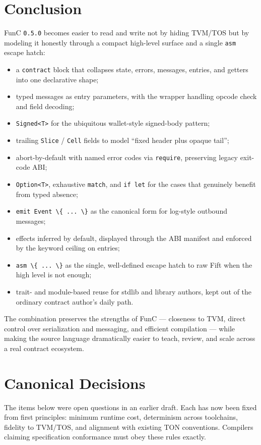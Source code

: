 \documentclass[12pt,oneside]{article}
\begin{document}
\section{Conclusion}
FunC \verb|0.5.0| becomes easier to read and write not by hiding
TVM/TOS but by modeling it honestly through a compact high-level
surface and a single \verb|asm| escape hatch:

\begin{itemize}
\item a \verb|contract| block that collapses state, errors, messages,
entries, and getters into one declarative shape;
\item typed messages as entry parameters, with the wrapper handling
opcode check and field decoding;
\item \verb|Signed<T>| for the ubiquitous wallet-style signed-body
pattern;
\item trailing \verb|Slice| / \verb|Cell| fields to model
``fixed header plus opaque tail'';
\item abort-by-default with named error codes via \verb|require|,
preserving legacy exit-code ABI;
\item \verb|Option<T>|, exhaustive \verb|match|, and \verb|if let|
for the cases that genuinely benefit from typed absence;
\item \verb|emit Event \{ ... \}| as the canonical form for log-style
outbound messages;
\item effects inferred by default, displayed through the ABI manifest
and enforced by the keyword ceiling on entries;
\item \verb|asm \{ ... \}| as the single, well-defined escape hatch to
raw Fift when the high level is not enough;
\item trait- and module-based reuse for stdlib and library authors,
kept out of the ordinary contract author's daily path.
\end{itemize}

The combination preserves the strengths of FunC --- closeness to TVM,
direct control over serialization and messaging, and efficient
compilation --- while making the source language dramatically easier
to teach, review, and scale across a real contract ecosystem.

\section{Canonical Decisions}
\label{sec:canonical-decisions}
The items below were open questions in an earlier draft. Each has now been
fixed from first principles: minimum runtime cost, determinism across
toolchains, fidelity to TVM/TOS, and alignment with existing TON conventions.
Compilers claiming specification conformance must obey these rules exactly.
\end{document}
